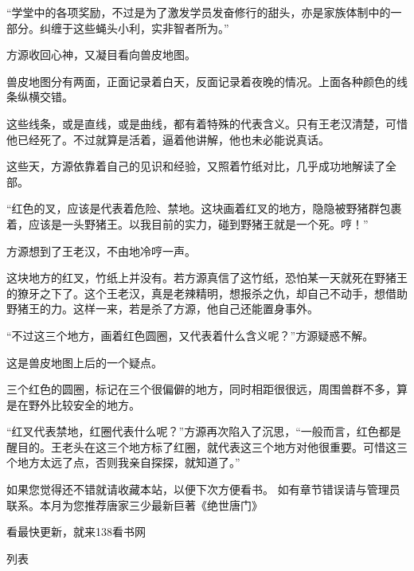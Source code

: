 \begin{this_body}
“学堂中的各项奖励，不过是为了激发学员发奋修行的甜头，亦是家族体制中的一部分。纠缠于这些蝇头小利，实非智者所为。”

方源收回心神，又凝目看向兽皮地图。

兽皮地图分有两面，正面记录着白天，反面记录着夜晚的情况。上面各种颜色的线条纵横交错。

这些线条，或是直线，或是曲线，都有着特殊的代表含义。只有王老汉清楚，可惜他已经死了。不过就算是活着，逼着他讲解，他也未必能说真话。

这些天，方源依靠着自己的见识和经验，又照着竹纸对比，几乎成功地解读了全部。

“红色的叉，应该是代表着危险、禁地。这块画着红叉的地方，隐隐被野猪群包裹着，应该是一头野猪王。以我目前的实力，碰到野猪王就是一个死。哼！”

方源想到了王老汉，不由地冷哼一声。

这块地方的红叉，竹纸上并没有。若方源真信了这竹纸，恐怕某一天就死在野猪王的獠牙之下了。这个王老汉，真是老辣精明，想报杀之仇，却自己不动手，想借助野猪王的力。这样一来，若是杀了方源，他自己还能置身事外。

“不过这三个地方，画着红色圆圈，又代表着什么含义呢？”方源疑惑不解。

这是兽皮地图上后的一个疑点。

三个红色的圆圈，标记在三个很偏僻的地方，同时相距很很远，周围兽群不多，算是在野外比较安全的地方。

“红叉代表禁地，红圈代表什么呢？”方源再次陷入了沉思，“一般而言，红色都是醒目的。王老头在这三个地方标了红圈，就代表这三个地方对他很重要。可惜这三个地方太远了点，否则我亲自探探，就知道了。”

如果您觉得还不错就请收藏本站，以便下次方便看书。 如有章节错误请与管理员联系。本月为您推荐唐家三少最新巨著《绝世唐门》

看最快更新，就来138看书网

列表

\end{this_body}

